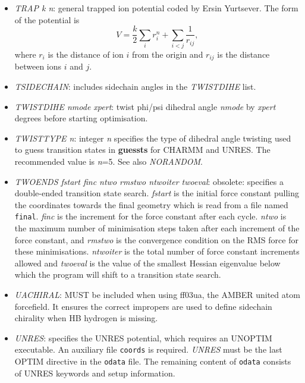 \documentclass[12pt,a4paper,dvips]{article}
\begin{document}
\begin{itemize}
\item {\it TRAP k n\/}: general trapped ion potential coded by Ersin Yurtsever. 
The form of the potential is 
\begin{displaymath}
V=\frac{k}{2}\sum_i r_i^n + \sum_{i<j} \frac{1}{r_{ij}},
\end{displaymath}
where $r_i$ is the distance of ion $i$ from the origin and
$r_{ij}$ is the distance between ions $i$ and $j$.

\item {\it TSIDECHAIN\/}: includes sidechain angles in the {\it TWISTDIHE\/} list.

\item {\it TWISTDIHE nmode xpert\/}: twist phi/psi dihedral angle {\it nmode\/} by 
{\it xpert\/} degrees before starting optimisation.

\item {\it TWISTTYPE n\/}: integer {\it n\/} specifies the type of dihedral angle twisting
used to  guess transition states in {\bf guessts} for CHARMM and UNRES.
The recommended value is {\it n}=5. See also {\it NORANDOM\/}.

\item {\it TWOENDS fstart finc ntwo rmstwo ntwoiter twoeval\/}: obsolete: specifies a double-ended transition
state search. {\it fstart\/} is the initial force constant pulling the coordinates towards the final
geometry which is read from a file named {\tt final}. {\it finc\/} is the increment for the force 
constant after each cycle. {\it ntwo\/} is the maximum number of minimisation steps taken after each
increment of the force constant, and {\it rmstwo\/} is the convergence condition on the RMS force
for these minimisations. {\it ntwoiter\/} is the total number of force constant increments allowed
and {\it twoeval\/} is the value of the smallest Hessian eigenvalue below which the program will
shift to a transition state search.

\item {\it UACHIRAL\/}: MUST be included when using ff03ua, the AMBER united atom forcefield. It ensures the correct impropers are used to define sidechain 
chirality when HB hydrogen is missing.

\item {\it UNRES\/}: specifies the UNRES potential, which requires an UNOPTIM executable.
An auxiliary file {\tt coords} is required. {\it UNRES} must be the last OPTIM directive in the
{\tt odata} file. The remaining content of {\tt odata} consists of UNRES keywords and
setup information.


\end{itemize}
\end{document}
